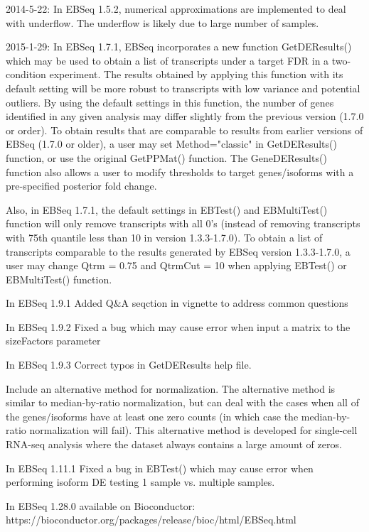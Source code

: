 \documentclass{article}
\begin{document}
2014-5-22: In EBSeq 1.5.2, numerical approximations are implemented to deal with
underflow. The underflow is likely due to large number of samples.

2015-1-29: In EBSeq 1.7.1, EBSeq incorporates a new function
GetDEResults() which may be used to obtain a list of transcripts under a target FDR in a two-condition experiment.
The results obtained by applying this function with its default setting will be
more robust to transcripts with low variance and potential outliers.
By using the default settings in this function,
the number of genes identified in any given analysis may
differ slightly from the previous version (1.7.0 or order). 
To obtain results that are comparable
to results from earlier versions of EBSeq (1.7.0 or older), a user may set
Method="classic" in GetDEResults() function, or use the original GetPPMat() function.
The GeneDEResults() function also allows a user to modify thresholds to
target genes/isoforms with a pre-specified posterior fold change.

Also, in EBSeq 1.7.1, the default settings in EBTest() and EBMultiTest() function
will only remove transcripts with all 0's (instead of removing transcripts with 
75th quantile less than 10 in version 1.3.3-1.7.0).
To obtain a list of transcripts comparable to the results generated by     EBSeq version 1.3.3-1.7.0, a user may change Qtrm = 0.75 and QtrmCut = 10
when applying EBTest() or EBMultiTest() function.

In EBSeq 1.9.1 Added Q$\&$A seqction in vignette to address common questions

In EBSeq 1.9.2 Fixed a bug which may cause error when input a matrix to the sizeFactors parameter

In EBSeq 1.9.3 Correct typos in GetDEResults help file.

Include an alternative method for normalization. The alternative method is similar to median-by-ratio normalization, 
    	but can deal with the cases when all of the genes/isoforms have at least one zero counts (in which case the 
    	median-by-ratio normalization will fail). This alternative method is developed for single-cell RNA-seq analysis
    	where the dataset always contains a large amount of zeros.
    	
In EBSeq 1.11.1 Fixed a bug in EBTest() which may cause error when performing isoform DE testing 1 sample vs. multiple samples.


In EBSeq 1.28.0 available on Bioconductor: https://bioconductor.org/packages/release/bioc/html/EBSeq.html
\end{document}

